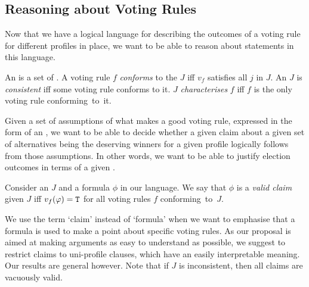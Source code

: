 \documentclass{comsoc2016}
\begin{document}


\subsection{Reasoning about Voting Rules}

Now that we have a logical language for describing the outcomes of a voting rule for different profiles in place, we want to be able to reason about statements in this language. 

\begin{definition}
An \emph{\laxiomatisation} is a set of \txtlaxioms{}. A voting rule $f$ \emph{conforms} to the \laxiomatisation{} $J$ iff $v_f$ satisfies all \txtlaxioms{} $j$ in $J$. An \laxiomatisation{} $J$ is \emph{consistent} iff some voting rule conforms to it. $J$ \emph{characterises} $f$ iff $f$ is the only voting rule conforming~to~it.
\end{definition}

Given a set of assumptions of what makes a good voting rule, expressed in the form of an \laxiomatisation{}, we want to be able to decide whether a given claim about a given set of alternatives being the deserving winners for a given profile logically follows from those assumptions. In other words, we want to be able to justify election outcomes in terms of a given \laxiomatisation{}. 

\begin{definition}%
	Consider an \laxiomatisation{} $J$ and a formula $\phi$ in our language. We say that $\phi$ is a \emph{valid claim} given $J$ iff $v_f(\varphi)=\texttt{T}$ for all voting rules $f$ conforming~to~$J$.
\end{definition}

We use the term ‘claim’ instead of ‘formula’ when we want to emphasise that a formula is used to make a point about specific voting rules.
As our proposal is aimed at making arguments as easy to understand as possible, we suggest to restrict claims to uni-profile clauses, which have an easily interpretable meaning. Our results are general however.
Note that if $J$ is inconsistent, then all claims are vacuously valid.
\end{document}
